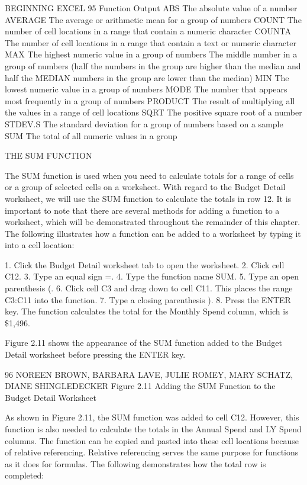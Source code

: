 BEGINNING EXCEL 95
Function     Output
ABS          The absolute value of a number
AVERAGE      The average or arithmetic mean for a group of numbers
COUNT        The number of cell locations in a range that contain a numeric character
COUNTA       The number of cell locations in a range that contain a text or numeric character
MAX          The highest numeric value in a group of numbers
The middle number in a group of numbers (half the numbers in the group are higher than the median and half the
MEDIAN
numbers in the group are lower than the median)
MIN          The lowest numeric value in a group of numbers
MODE         The number that appears most frequently in a group of numbers
PRODUCT The result of multiplying all the values in a range of cell locations
SQRT         The positive square root of a number
STDEV.S      The standard deviation for a group of numbers based on a sample
SUM          The total of all numeric values in a group


THE SUM FUNCTION

The SUM function is used when you need to calculate totals for a range of cells or a group of selected
cells on a worksheet. With regard to the Budget Detail worksheet, we will use the SUM function
to calculate the totals in row 12. It is important to note that there are several methods for adding a
function to a worksheet, which will be demonstrated throughout the remainder of this chapter. The
following illustrates how a function can be added to a worksheet by typing it into a cell location:

1.    Click the Budget Detail worksheet tab to open the worksheet.
2.    Click cell C12.
3.    Type an equal sign =.
4.    Type the function name SUM.
5.    Type an open parenthesis (.
6.    Click cell C3 and drag down to cell C11. This places the range C3:C11 into the function.
7.    Type a closing parenthesis ).
8.    Press the ENTER key. The function calculates the total for the Monthly Spend column, which is
\$1,496.

Figure 2.11 shows the appearance of the SUM function added to the Budget Detail worksheet before
pressing the ENTER key.




96 NOREEN BROWN, BARBARA LAVE, JULIE ROMEY, MARY SCHATZ, DIANE SHINGLEDECKER
Figure 2.11 Adding the SUM Function to the Budget Detail Worksheet


As shown in Figure 2.11, the SUM function was added to cell C12. However, this function is also
needed to calculate the totals in the Annual Spend and LY Spend columns. The function can be copied
and pasted into these cell locations because of relative referencing. Relative referencing serves the
same purpose for functions as it does for formulas. The following demonstrates how the total row is
completed:

